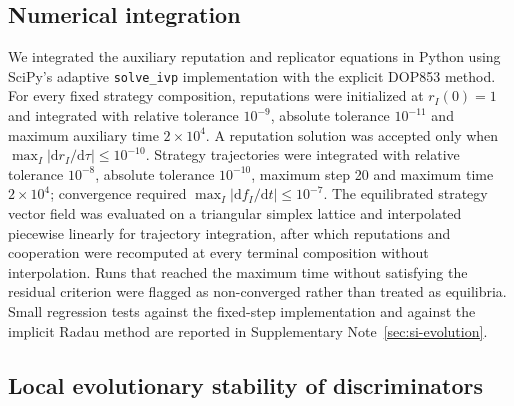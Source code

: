 \documentclass[fleqn,10pt]{wlscirep}
\begin{document}
\subsection*{Numerical integration}

We integrated the auxiliary reputation and replicator equations in Python using SciPy's adaptive \texttt{solve\_ivp} implementation with the explicit DOP853 method. For every fixed strategy composition, reputations were initialized at $r_I(0)=1$ and integrated with relative tolerance $10^{-9}$, absolute tolerance $10^{-11}$ and maximum auxiliary time $2\times10^4$. A reputation solution was accepted only when $\max_I|\mathrm dr_I/\mathrm d\tau|\leq10^{-10}$. Strategy trajectories were integrated with relative tolerance $10^{-8}$, absolute tolerance $10^{-10}$, maximum step 20 and maximum time $2\times10^4$; convergence required $\max_I|\mathrm df_I/\mathrm dt|\leq10^{-7}$. The equilibrated strategy vector field was evaluated on a triangular simplex lattice and interpolated piecewise linearly for trajectory integration, after which reputations and cooperation were recomputed at every terminal composition without interpolation. Runs that reached the maximum time without satisfying the residual criterion were flagged as non-converged rather than treated as equilibria. Small regression tests against the fixed-step implementation and against the implicit Radau method are reported in Supplementary Note~\ref{sec:si-evolution}.

\subsection*{Local evolutionary stability of discriminators}
\end{document}
